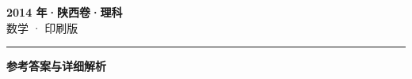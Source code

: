 \documentclass[zihao=5, a4paper]{ctexart}
\begin{document}
\begin{center}
  {\Large\bfseries 2014 年·陕西卷·理科}\\[4pt]
  {\large 数学 · 印刷版}
\end{center}
\medskip
{}

\par\bigskip\hrule\bigskip
{}
\Needspace{0.55\textheight}
\begin{center}{\large\bfseries 参考答案与详细解析}\end{center}
\smallskip

\end{document}
